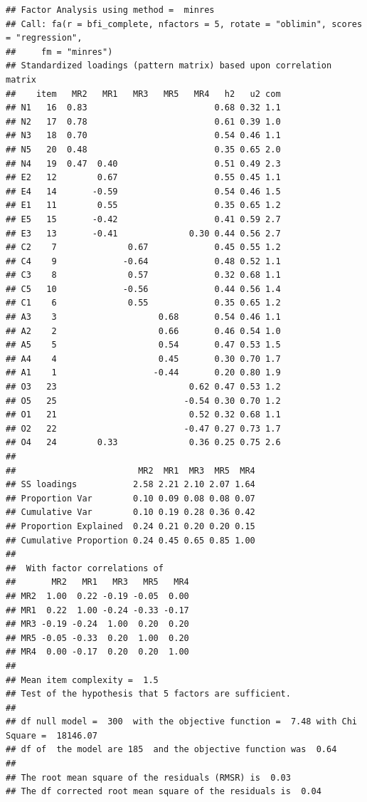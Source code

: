 \documentclass[
]{article}
\begin{document}
\begin{verbatim}
## Factor Analysis using method =  minres
## Call: fa(r = bfi_complete, nfactors = 5, rotate = "oblimin", scores = "regression", 
##     fm = "minres")
## Standardized loadings (pattern matrix) based upon correlation matrix
##    item   MR2   MR1   MR3   MR5   MR4   h2   u2 com
## N1   16  0.83                         0.68 0.32 1.1
## N2   17  0.78                         0.61 0.39 1.0
## N3   18  0.70                         0.54 0.46 1.1
## N5   20  0.48                         0.35 0.65 2.0
## N4   19  0.47  0.40                   0.51 0.49 2.3
## E2   12        0.67                   0.55 0.45 1.1
## E4   14       -0.59                   0.54 0.46 1.5
## E1   11        0.55                   0.35 0.65 1.2
## E5   15       -0.42                   0.41 0.59 2.7
## E3   13       -0.41              0.30 0.44 0.56 2.7
## C2    7              0.67             0.45 0.55 1.2
## C4    9             -0.64             0.48 0.52 1.1
## C3    8              0.57             0.32 0.68 1.1
## C5   10             -0.56             0.44 0.56 1.4
## C1    6              0.55             0.35 0.65 1.2
## A3    3                    0.68       0.54 0.46 1.1
## A2    2                    0.66       0.46 0.54 1.0
## A5    5                    0.54       0.47 0.53 1.5
## A4    4                    0.45       0.30 0.70 1.7
## A1    1                   -0.44       0.20 0.80 1.9
## O3   23                          0.62 0.47 0.53 1.2
## O5   25                         -0.54 0.30 0.70 1.2
## O1   21                          0.52 0.32 0.68 1.1
## O2   22                         -0.47 0.27 0.73 1.7
## O4   24        0.33              0.36 0.25 0.75 2.6
## 
##                        MR2  MR1  MR3  MR5  MR4
## SS loadings           2.58 2.21 2.10 2.07 1.64
## Proportion Var        0.10 0.09 0.08 0.08 0.07
## Cumulative Var        0.10 0.19 0.28 0.36 0.42
## Proportion Explained  0.24 0.21 0.20 0.20 0.15
## Cumulative Proportion 0.24 0.45 0.65 0.85 1.00
## 
##  With factor correlations of 
##       MR2   MR1   MR3   MR5   MR4
## MR2  1.00  0.22 -0.19 -0.05  0.00
## MR1  0.22  1.00 -0.24 -0.33 -0.17
## MR3 -0.19 -0.24  1.00  0.20  0.20
## MR5 -0.05 -0.33  0.20  1.00  0.20
## MR4  0.00 -0.17  0.20  0.20  1.00
## 
## Mean item complexity =  1.5
## Test of the hypothesis that 5 factors are sufficient.
## 
## df null model =  300  with the objective function =  7.48 with Chi Square =  18146.07
## df of  the model are 185  and the objective function was  0.64 
## 
## The root mean square of the residuals (RMSR) is  0.03 
## The df corrected root mean square of the residuals is  0.04 

\end{verbatim}
\end{document}
